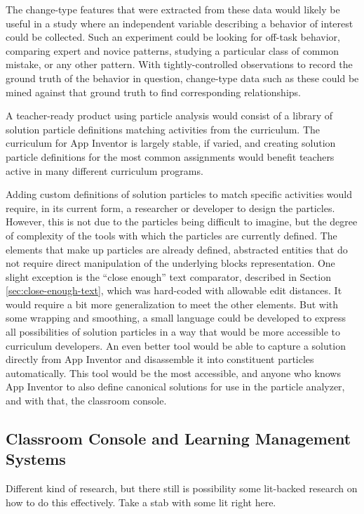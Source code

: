 The change-type features that were extracted from these data would likely be useful in a study where an independent variable describing a behavior of interest could be collected. Such an experiment could be looking for off-task behavior, comparing expert and novice patterns, studying a particular class of common mistake, or any other pattern. With tightly-controlled observations to record the ground truth of the behavior in question, change-type data such as these could be mined against that ground truth to find corresponding relationships. 

A teacher-ready product using particle analysis would consist of a library of solution particle definitions matching activities from the curriculum. The curriculum for App Inventor is largely stable, if varied, and creating solution particle definitions for the most common assignments would benefit teachers active in many different curriculum programs. 

Adding custom definitions of solution particles to match specific activities would require, in its current form, a researcher or developer to design the particles. However, this is not due to the particles being difficult to imagine, but the degree of complexity of the tools with which the particles are currently defined. The elements that make up particles are already defined, abstracted entities that do not require direct manipulation of the underlying blocks representation. One slight exception is the ``close enough'' text comparator, described in Section \ref{sec:close-enough-text}, which was hard-coded with allowable edit distances. It would require a bit more generalization to meet the other elements. But with some wrapping and smoothing, a small language could be developed to express all possibilities of solution particles in a way that would be more accessible to curriculum developers. An even better tool would be able to capture a solution directly from App Inventor and disassemble it into constituent particles automatically. This tool would be the most accessible, and anyone who knows App Inventor to also define canonical solutions for use in the particle analyzer, and with that, the classroom console. 

\subsection{Classroom Console and Learning Management Systems}
Different kind of research, but there still is possibility some lit-backed research on how to do this effectively. Take a stab with some lit right here.

